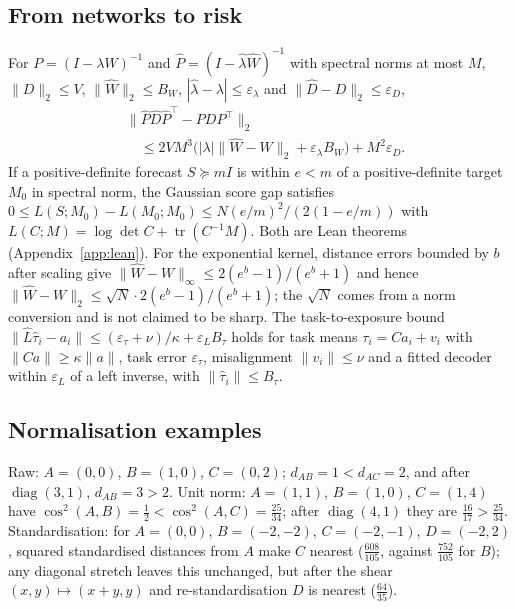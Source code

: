 \documentclass[letterpaper]{article} %
\theoremstyle{definition}
\newcommand{\norm}[1]{\lVert #1\rVert}
\newcommand{\diag}{\operatorname{diag}}
\begin{document}
\subsection{From networks to risk}\label{app:chain}
For $P=(I-\lambda W)^{-1}$ and $\hat P=(I-\hat\lambda\hat W)^{-1}$ with spectral
norms at most $M$, $\norm D_2\le V$, $\norm{\hat W}_2\le B_W$,
$|\hat\lambda-\lambda|\le\varepsilon_\lambda$ and $\norm{\hat D-D}_2\le
\varepsilon_D$,
\begin{align*}
  &\norm{\hat P\hat D\hat P^\top-PDP^\top}_2\\
  &\quad\le2VM^3\bigl(|\lambda|\norm{\hat W-W}_2+\varepsilon_\lambda B_W\bigr)
  +M^2\varepsilon_D.
\end{align*}
If a positive-definite forecast $S\succeq mI$ is within $e<m$ of a
positive-definite target $M_0$ in spectral norm, the Gaussian score gap
satisfies $0\le L(S;M_0)-L(M_0;M_0)\le N(e/m)^2/(2(1-e/m))$ with
$L(C;M)=\log\det C+\operatorname{tr}(C^{-1}M)$. Both are Lean theorems
(Appendix~\ref{app:lean}). For the exponential kernel, distance errors bounded
by $b$ after scaling give $\norm{\hat W-W}_\infty\le2(e^b-1)/(e^b+1)$ and hence
$\norm{\hat W-W}_2\le\sqrt N\cdot2(e^b-1)/(e^b+1)$; the $\sqrt N$ comes from a
norm conversion and is not claimed to be sharp. The task-to-exposure bound
$\norm{\hat L\hat\tau_i-a_i}\le(\varepsilon_\tau+\nu)/\kappa+\varepsilon_LB_\tau$
holds for task means $\tau_i=Ca_i+v_i$ with $\norm{Ca}\ge\kappa\norm a$, task
error $\varepsilon_\tau$, misalignment $\norm{v_i}\le\nu$ and a fitted decoder
within $\varepsilon_L$ of a left inverse, with $\norm{\hat\tau_i}\le B_\tau$.

\subsection{Normalisation examples}\label{app:examples}
Raw: $A=(0,0)$, $B=(1,0)$, $C=(0,2)$; $d_{AB}=1<d_{AC}=2$, and after
$\diag(3,1)$, $d_{AB}=3>2$. Unit norm: $A=(1,1)$, $B=(1,0)$, $C=(1,4)$ have
$\cos^2(A,B)=\tfrac12<\cos^2(A,C)=\tfrac{25}{34}$; after $\diag(4,1)$ they are
$\tfrac{16}{17}>\tfrac{25}{34}$. Standardisation: for $A=(0,0)$, $B=(-2,-2)$,
$C=(-2,-1)$, $D=(-2,2)$, squared standardised distances from $A$ make $C$
nearest ($\tfrac{608}{105}$, against $\tfrac{752}{105}$ for $B$); any diagonal
stretch leaves this unchanged, but after the shear $(x,y)\mapsto(x+y,y)$ and
re-standardisation $D$ is nearest ($\tfrac{64}{35}$).
\end{document}
